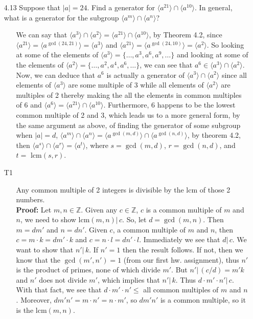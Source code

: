 \documentclass[12pt]{article}
\begin{document}
\begin{enumerate}
\item[4.13] Suppose that $|a| = 24$. Find a generator for $\langle a^{21}\rangle \cap
\langle a^{10}\rangle$. In general, what is a generator for the subgroup 
$\langle a^m \rangle \cap \langle a^n \rangle$?
\begin{enumerate}
\item[] We can say that $\langle a^3\rangle \cap \langle a^2\rangle = \langle a^{21}\rangle 
\cap \langle a^{10}\rangle$, by Theorem 4.2, since $\langle a^{21}\rangle = \langle 
a^{\gcd(24, 21)}\rangle = \langle a^3\rangle$ and $\langle a^{21}\rangle = 
\langle a^{\gcd(24, 10)}\rangle = \langle a^2\rangle$. So looking at some of the elements
of $\langle a^3\rangle = \{\ldots, a^3, a^6, a^9, \ldots \}$ and looking at some 
of the elements of $\langle a^2\rangle = \{\ldots, a^2, a^4, a^6,\ldots \}$, we can 
see that $a^6 \in \langle a^3\rangle \cap \langle a^2\rangle$. Now, we can deduce that
$a^6$ is actually a generator of $\langle a^3\rangle \cap \langle a^2\rangle$ 
since all elements of $\langle a^3\rangle$ are some multiple of 3 while all elements of 
$\langle a^2\rangle$ are multiples of 2 thereby making the all the elements in common multiples of 6 
and $\langle a^6\rangle = \langle a^{21}\rangle \cap \langle a^{10}\rangle$. 
Furthermore, 6 happens to be the lowest common multiple of 2 and 3, which leads
us to a more general form, by the same argument as above,
of finding the generator of some subgroup when $|a| = d$, 
$\langle a^m\rangle \cap \langle a^n\rangle = \langle a^{\gcd(m, d)}\rangle 
\cap \langle a^{\gcd(n, d)}\rangle$, by theorem 4.2, then $\langle a^s\rangle 
\cap \langle a^r\rangle = \langle a^t\rangle$, where $s = \gcd(m, d)$, $r = \gcd(n, d)$, 
and $t = $ lcm$(s, r)$.
\end{enumerate}

\item[T1]
\begin{enumerate}
\item[] Any common multiple of 2 integers is divisible by the lcm of those 2 numbers. \\
{\bf Proof:} Let $m, n \in \mathbb{Z}$. Given any $c \in \mathbb{Z}$, $c$ is a common 
multiple of $m$ and $n$, we need to show lcm$(m, n) | \, c$. So, let $d = \gcd(m, n)$. 
Then $m = dm'$ and $n = dn'$. Given $c$, a common multiple of $m$ and $n$, then 
$c = m \cdot k = dm' \cdot k$ and $c = n \cdot l = dn' \cdot l$. Immediately we see
that $d | \, c$. We want to show that $n' |\, k$. If $n' = 1$ then the result follows.
If not, then we know that the $\gcd(m', n') = 1$ (from our first hw. assignment), thus
$n'$ is the product of primes, none of which divide $m'$. But $n' | \, (c/d) = m'k$ and 
$n'$ does not divide $m'$, which implies that $n' |\, k$. Thus $d \cdot m' \cdot n' | \, c$.
With that fact, we see that $d \cdot m' \cdot n' \leq $ all common multiples of $m$ and
$n$. Moreover, $dm'n' = m \cdot n' = n \cdot m'$, so $dm'n'$ is a common multiple, so it 
is the lcm$(m, n)$.
\end{enumerate}


\end{enumerate}
\end{document}
